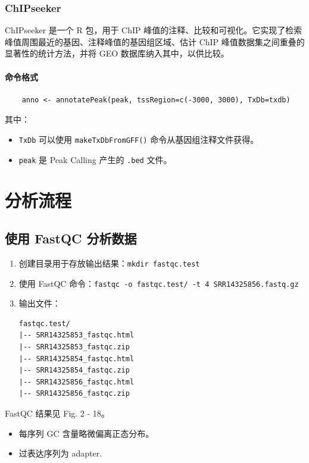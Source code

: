 \documentclass[UTF8]{ctexart}
\begin{document}
\subsubsection{ChIPseeker}

ChIPseeker 是一个 R 包，用于 ChIP 峰值的注释、比较和可视化。它实现了检索峰值周围最近的基因、注释峰值的基因组区域、估计 ChIP 峰值数据集之间重叠的显著性的统计方法，并将 GEO 数据库纳入其中，以供比较。

\paragraph*{命令格式}
\begin{lstlisting}
	anno <- annotatePeak(peak, tssRegion=c(-3000, 3000), TxDb=txdb)
\end{lstlisting}

其中：

\begin{itemize}
	\item \verb|TxDb| 可以使用 \verb|makeTxDbFromGFF()| 命令从基因组注释文件获得。
	\item \verb|peak| 是 Peak Calling 产生的 \verb|.bed| 文件。 
\end{itemize}

\section{分析流程}

\subsection{使用 FastQC 分析数据}

\begin{enumerate}
	\item 创建目录用于存放输出结果：\verb|mkdir fastqc.test|
	\item 使用 FastQC 命令：\verb|fastqc -o fastqc.test/ -t 4 SRR14325856.fastq.gz |
	\item 输出文件：
	\begin{lstlisting}
fastqc.test/
|-- SRR14325853_fastqc.html
|-- SRR14325853_fastqc.zip
|-- SRR14325854_fastqc.html
|-- SRR14325854_fastqc.zip
|-- SRR14325856_fastqc.html
|-- SRR14325856_fastqc.zip
	\end{lstlisting}
\end{enumerate}

FastQC 结果见 Fig. 2 - 18。
\begin{itemize}
	\item 每序列 GC 含量略微偏离正态分布。
	\item 过表达序列为 adapter.
\end{itemize}
\end{document}
